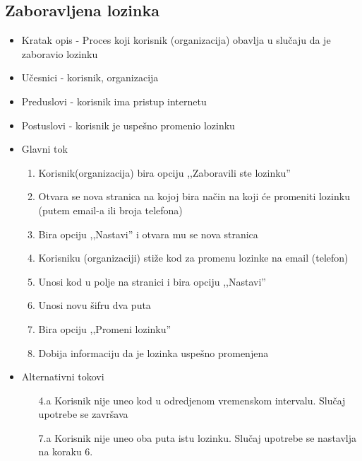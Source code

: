 \subsection{Zaboravljena lozinka}
\begin{itemize}
    \item Kratak opis - Proces koji korisnik (organizacija) obavlja u slučaju da je zaboravio lozinku
    \item Učesnici - korisnik, organizacija
    \item Preduslovi - korisnik ima pristup internetu
    \item Postuslovi - korisnik je uspešno promenio lozinku
    \item Glavni tok
        \begin{enumerate}
        \item Korisnik(organizacija) bira opciju ,,Zaboravili ste lozinku''
        \item Otvara se nova stranica na kojoj bira način na koji će promeniti lozinku (putem email-a ili broja telefona)
        \item Bira opciju ,,Nastavi'' i otvara mu se nova stranica
        \item Korisniku (organizaciji) stiže kod za promenu lozinke na email (telefon)
        \item Unosi kod u polje na stranici i bira opciju ,,Nastavi''
        \item Unosi novu šifru dva puta
        \item Bira opciju ,,Promeni lozinku''
        \item Dobija informaciju da je lozinka uspešno promenjena
        \end{enumerate}
    \item Alternativni tokovi
        \begin{itemize}
            \item[4.a] Korisnik nije uneo kod u odredjenom vremenskom intervalu. Slučaj upotrebe se završava
            \item[7.a] Korisnik nije uneo oba puta istu lozinku. Slučaj upotrebe se nastavlja na koraku 6.
            
        \end{itemize}
\end{itemize}